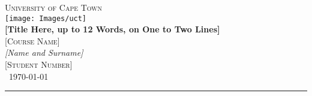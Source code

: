 \documentclass[11pt]{article} %
\begin{document}
	
	
	\begin{titlepage} %
		\newcommand{\HRule}{\rule{\linewidth}{0.2mm}} %
		
		\center %
		
		\textsc{\LARGE University of Cape Town}\\[0.2cm] %
		
		\texttt{[image: Images/uct]}\\[0.2cm] %
		
		{\huge\bfseries [Title Here, up to 12 Words, on One to Two Lines] }\\[0.4cm] %
		
		\textsc{\Large [Course Name]}\\[0.5cm] %
		
		{\large\textit{[Name and Surname]}}\\ %
		\textsc{[Student Number]} \\[0.5cm] %
		
		{\large\ \today} %
		
		\HRule\\[0.5cm]
		
			
		\begin{abstract}
			\lipsum[1-1]  \\ %
			

\end{abstract}
\end{titlepage}
\end{document}
